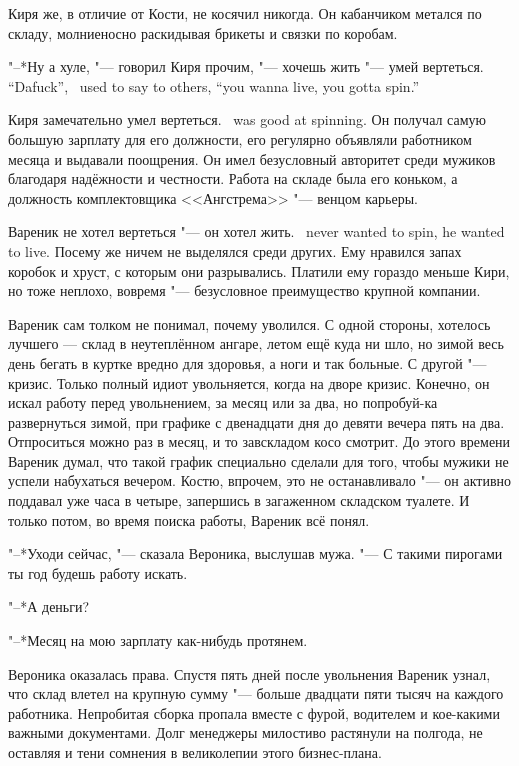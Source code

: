 Киря же, в отличие от Кости, не косячил никогда.
Он кабанчиком метался по складу, молниеносно раскидывая брикеты и связки по коробам.

{"--*Ну а хуле, "--- говорил Киря прочим, "--- хочешь жить "--- умей вертеться.}
{``Dafuck'', \Kirya\ used to say to others, ``you wanna live, you gotta spin.''}

{Киря замечательно умел вертеться.}
{\Kirya\ was good at spinning.}
Он получал самую большую зарплату для его должности, его регулярно объявляли работником месяца и выдавали поощрения.
Он имел безусловный авторитет среди мужиков благодаря надёжности и честности.
Работа на складе была его коньком, а должность комплектовщика <<Ангстрема>> "--- венцом карьеры.

{Вареник не хотел вертеться "--- он хотел жить.}
{\Varenik\ never wanted to spin, he wanted to live.}
Посему же ничем не выделялся среди других.
Ему нравился запах коробок и хруст, с которым они разрывались.
Платили ему гораздо меньше Кири, но тоже неплохо, вовремя "--- безусловное преимущество крупной компании.

Вареник сам толком не понимал, почему уволился.
С одной стороны, хотелось лучшего --- склад в неутеплённом ангаре, летом ещё куда ни шло, но зимой весь день бегать в куртке вредно для здоровья, а ноги и так больные.
С другой "--- кризис.
Только полный идиот увольняется, когда на дворе кризис.
Конечно, он искал работу перед увольнением, за месяц или за два, но попробуй-ка развернуться зимой, при графике с двенадцати дня до девяти вечера пять на два.
Отпроситься можно раз в месяц, и то завскладом косо смотрит.
До этого времени Вареник думал, что такой график специально сделали для того, чтобы мужики не успели набухаться вечером.
Костю, впрочем, это не останавливало "--- он активно поддавал уже часа в четыре, запершись в загаженном складском туалете.
И только потом, во время поиска работы, Вареник всё понял.

"--*Уходи сейчас, "--- сказала Вероника, выслушав мужа.
"--- С такими пирогами ты год будешь работу искать.

"--*А деньги?

"--*Месяц на мою зарплату как-нибудь протянем.

Вероника оказалась права.
Спустя пять дней после увольнения Вареник узнал, что склад влетел на крупную сумму "--- больше двадцати пяти тысяч на каждого работника.
Непробитая сборка пропала вместе с фурой, водителем и кое-какими важными документами.
Долг менеджеры милостиво растянули на полгода, не оставляя и тени сомнения в великолепии этого бизнес-плана.

